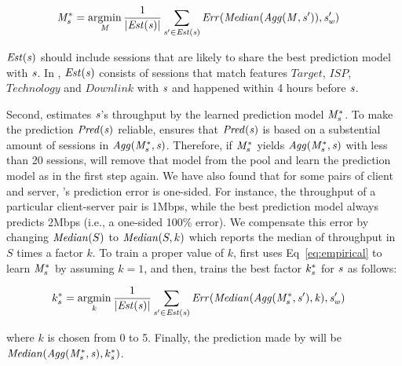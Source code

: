 \begin{align}
&\mathit{M}^{\mathit{*}}_{\mathit{s}}=\operatorname*{argmin}_{\mathit{M}}\frac{1}{|\mathit{\mathit{Est}(\mathit{s})}|}\sum_{\mathit{s}'\in\mathit{\mathit{Est}(\mathit{s})}}
\mathit{Err(\mathit{Median}(\mathit{Agg(\mathit{M},\mathit{s}')}),\mathit{\mathit{s}'_{w}})} \label{eq:empirical}
\end{align}

\noindent$\mathit{\mathit{Est}(\mathit{s})}$ should include sessions that are likely to share the best prediction model with $\mathit{s}$. In \name, $\mathit{\mathit{Est}(\mathit{s})}$ consists of sessions that match features $\mathit{Target}$, $\mathit{ISP}$, $\mathit{Technology}$ and $\mathit{Downlink}$ with $\mathit{s}$ and happened within 4 hours before $\mathit{s}$. 


 Second, \name estimates $\mathit{s}$'s throughput by the learned prediction model $\mathit{M}^{\mathit{*}}_{\mathit{s}}$.
To make the prediction $\mathit{Pred(\mathit{s})}$ reliable, \name ensures that $\mathit{Pred(\mathit{s})}$ is based on a substential amount of sessions in $\mathit{Agg(\mathit{M}^{\mathit{*}}_{\mathit{s}},\mathit{s})}$. Therefore, if $\mathit{M}^{\mathit{*}}_{\mathit{s}}$ yields $\mathit{Agg(\mathit{M}^{\mathit{*}}_{\mathit{s}},\mathit{s})}$ with less than 20 sessions, \name will remove that model from the pool and learn the prediction model as in the first step again.
We have also found that for some pairs of client and server, \name's prediction error is one-sided. For instance, the throughput of a particular client-server pair is 1Mbps, while the best prediction model always predicts 2Mbps (i.e., a one-sided 100\% error). We compensate this error by changing $\mathit{Median}(S)$ to $\mathit{Median}(S,k)$ which reports the median of throughput in $S$ times a factor $k$. To train a proper value of $k$, \name first uses Eq~\ref{eq:empirical} to learn $\mathit{M}^{\mathit{*}}_{\mathit{s}}$ by assuming $k=1$, and then, \name trains the best factor $k^{\mathit{*}}_{\mathit{s}}$ for $\mathit{s}$ as follows: 

\begin{align}
&k^{\mathit{*}}_{\mathit{s}}=\operatorname*{argmin}_{k}\frac{1}{|\mathit{\mathit{Est}(\mathit{s})}|}\sum_{\mathit{s}'\in\mathit{\mathit{Est}(\mathit{s})}}
\mathit{Err(\mathit{Median}(\mathit{Agg(\mathit{M}^{\mathit{*}}_{\mathit{s}},\mathit{s}')},k),\mathit{\mathit{s}'_{w}})} \nonumber
\end{align}

\noindent where $k$ is chosen from 0 to 5. Finally, the prediction made by \name will be $\mathit{Median}(\mathit{Agg(\mathit{M}^{\mathit{*}}_{\mathit{s}},\mathit{s})},k^{\mathit{*}}_{\mathit{s}})$.



